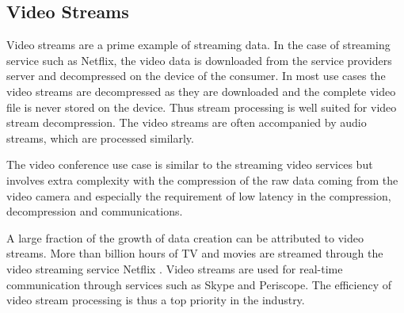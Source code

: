\subsection{Video Streams}
\label{subsec:video-streams}
Video streams are a prime example of streaming data. In the case of streaming service such as Netflix, the video data is downloaded from the service providers server and decompressed on the device of the consumer. In most use cases the video streams are decompressed as they are downloaded and the complete video file is never stored on the device. Thus stream processing is well suited for video stream decompression. The video streams are often accompanied by audio streams, which are processed similarly.~\cite{richardson2002video}

The video conference use case is similar to the streaming video services but involves extra complexity with the compression of the raw data coming from the video camera and especially the requirement of low latency in the compression, decompression and communications.

A large fraction of the growth of data creation can be attributed to video streams. More than billion hours of TV and movies are streamed through the video streaming service Netflix \cite{turner2014digital}. Video streams are used for real-time communication through services such as Skype and Periscope. The efficiency of video stream processing is thus a top priority in the industry.
